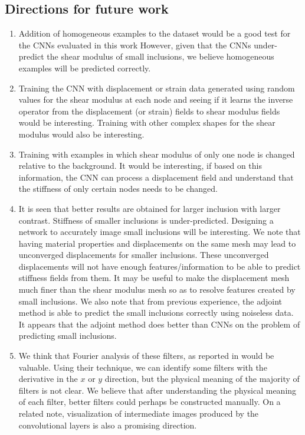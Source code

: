 \documentclass[12pt]{article}
\begin{document}
\subsection{Directions for future work}
\begin{enumerate}
\item{Addition of homogeneous examples to the dataset would be a good test for the CNNs evaluated in this work However, given that the CNNs under-predict the shear modulus of small inclusions, we believe homogeneous examples will be predicted correctly.}
\item{Training the CNN with displacement or strain data generated using random values for the shear modulus at each node and seeing if it learns the inverse operator from the displacement (or strain) fields to shear modulus fields would be interesting. Training with other complex shapes for the shear modulus would also be interesting.}
\item{Training with examples in which shear modulus of only one node is changed relative to the background. It would be interesting, if based on this information, the CNN can process a displacement field and understand that the stiffness of only certain nodes needs to be changed.}
\item{It is seen that better results are obtained for larger inclusion with larger contrast. Stiffness of smaller inclusions is under-predicted. Designing a network to accurately image small inclusions will be interesting. We note that having material properties and displacements on the same mesh may lead to unconverged displacements for smaller inclusions. These unconverged displacements will not have enough features/information to be able to predict stiffness fields from them. It may be useful to make the displacement mesh much finer than the shear modulus mesh so as to resolve features created by small inclusions. We also note that from previous experience, the adjoint method \cite{paper:oberai2003,paper:gokhale2008,paper:goenezen2011} is able to predict the small inclusions correctly using noiseless data. It appears that the adjoint method does better than CNNs on the problem of predicting small inclusions.}
\item{We think that Fourier analysis of these filters, as reported in \cite{paper:pateloberai2019} would be valuable. Using their technique, we can identify some filters with the derivative in the $x$ or $y$ direction, but the physical meaning of the majority of filters is not clear. We believe that after understanding the physical meaning of each filter, better filters could perhaps be constructed manually. On a related note, visualization of intermediate images produced by the convolutional layers is also a promising direction.}

\end{enumerate}
\end{document}
